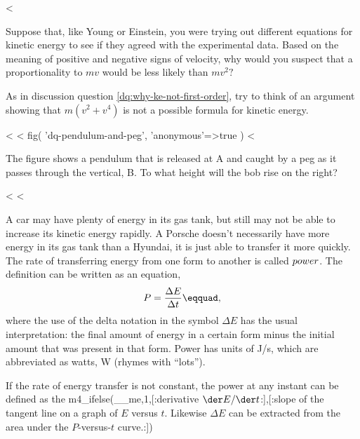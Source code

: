 <%

\pagebreak

\startdqs

\begin{dq}\label{dq:why-ke-not-first-order}
Suppose that, like Young or Einstein, you were trying out
different equations for kinetic energy to see if they agreed
with the experimental data. Based on the meaning of positive
and negative signs of velocity, why would you suspect that
a proportionality to $mv$ would be less likely than $mv^2?$
\end{dq}

\begin{dq}\label{dq:why-no-fourth-order-term-in-ke}
As in discussion question \ref{dq:why-ke-not-first-order}, try to
think of an argument showing that $m(v^2+v^4)$ is not a possible
formula for kinetic energy.
\end{dq}

<%
<%
  fig(
    'dq-pendulum-and-peg',
    {
      'anonymous'=>true
    }
  )
<%
\begin{dq}\label{dq:pendulum-and-peg}
The figure
 shows a pendulum that is released at A and
caught by a peg as it passes through the vertical, B. To
what height will the bob rise on the right?
\end{dq}

<%
<%

A car may have plenty of energy in its gas tank, but still
may not be able to increase its kinetic energy rapidly. A
Porsche doesn't necessarily have more energy in its gas tank
than a Hyundai, it is just able to transfer it more quickly.
The rate of transferring energy from one form to another is
called $\index{power}power$. The definition can be
written as an equation,
\begin{equation*}
                P    =     \frac{\Delta E}{\Delta t}\eqquad,
\end{equation*}
where the use of the delta notation in the symbol $\Delta E$
has the usual interpretation: the final amount of energy in a
certain form minus the initial amount that was present in
that form. Power has units of J/s, which are abbreviated as
watts, W (rhymes with ``lots'').

If the rate of energy transfer is not constant, the power at
any instant can be defined as the 
m4_ifelse(__me,1,[:derivative $\der E/\der t$:],[:slope of the tangent line
on a graph of $E$ versus $t$. Likewise $\Delta E$ can be
extracted from the area under the $P$-versus-$t$ curve.:])

